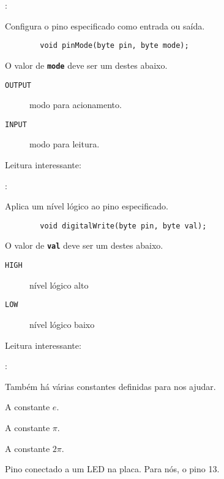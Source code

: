 \begin{frame}[b,fragile]{\insertsection: \insertsubsection}

	Configura o pino especificado como entrada ou saída.
	\begin{verbatim}
		void pinMode(byte pin, byte mode);
	\end{verbatim}

	O valor de \texttt{\textbf{mode}} deve ser um destes abaixo.
	\begin{description}
		\item[\texttt{OUTPUT}] modo para acionamento.
		\item[\texttt{INPUT}] modo para leitura.
	\end{description}

	\vfill
	Leitura interessante: 

\end{frame}


\begin{frame}[b,fragile]{\insertsection: \insertsubsection}

	Aplica um nível lógico ao pino especificado.
	\begin{verbatim}
		void digitalWrite(byte pin, byte val);
	\end{verbatim}

	O valor de \texttt{\textbf{val}} deve ser um destes abaixo.
	\begin{description}
		\item[\texttt{HIGH}] nível lógico alto
		\item[\texttt{LOW}] nível lógico baixo
	\end{description}

	\vfill
	Leitura interessante: 

\end{frame}


\begin{frame}{\insertsection: \insertsubsection}

	Também há várias constantes definidas para nos ajudar.
	\begin{description} %
		\item[\texttt{EULER}] A constante $e$.
		\item[\texttt{PI}] A constante $\pi$.
		\item[\texttt{TWO\_PI}] A constante $2\pi$.
		\item[\texttt{LED\_BUILTIN}] Pino conectado a um LED na placa. Para nós, o pino 13.
		\item[\texttt{...}]
	\end{description}

\end{frame}
